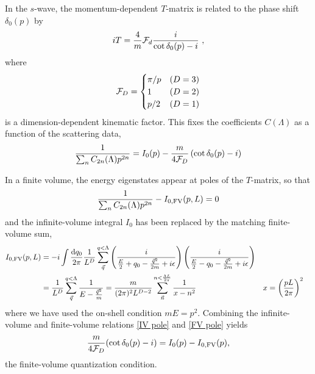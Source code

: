 In the $s$-wave, the momentum-dependent $T$-matrix is related to the phase shift $\delta_0(p)$ by
\begin{equation}\label{eq:cot delta}
    i T = \frac{4}{m}\mathcal{F}_d\frac{i}{\cot \delta_0(p)-i}\ ,
\end{equation}
where
\begin{equation}
    \mathcal{F}_D
    =
    \begin{cases}
        \pi/p   & (D=3)\\
        1       & (D=2)\\
        p/2     & (D=1)
\end{cases}
\end{equation}
is a dimension-dependent kinematic factor.
This fixes the coefficients $C(\Lambda)$ as a function of the scattering data,
\begin{equation}\label{eq:IV pole}
    \frac{1}{\sum_n C_{2n}(\Lambda) p^{2n}}
    =
    I_0(p) - \frac{m}{4 \mathcal{F}_D}\left(\cot \delta_0(p) - i\right)
\end{equation}

In a finite volume, the energy eigenstates appear at poles of the $T$-matrix, so that
\begin{equation}\label{eq:FV pole}
    \frac{1}{\sum_n C_{2n}(\Lambda) p^{2n}} - I_{0,\textrm{FV}}(p,L) = 0
\end{equation}
and the infinite-volume integral $I_0$ has been replaced by the matching finite-volume sum,
\begin{align}
I_{0,\textrm{FV}}(p,L)
    &=-i\int \frac { \mathrm {d}q_0}{2\pi} \frac{1}{L^D}\sum_{\vec{q}}^{q < \Lambda} \left( \frac { i } { \frac{E}{2} + q _ { 0 } - \frac{\vec{q}^2}{2m} + i \epsilon } \right) \left( \frac { i } { \frac{E}{2} - q _ { 0 } - \frac{\vec{q}^2}{2m} + i \epsilon } \right)
    \\
    &=\frac{1}{L^D}\sum_{\vec{q}}^{q < \Lambda} \frac { 1 } { E - \frac{\vec{q}^2}{m} }
    =\frac{m}{(2\pi)^2 L^{D-2}} \sum_{\vec{n}}^{n < \frac{\Lambda L}{2\pi}} \frac{1}{x-n^2}
    &
    x &= \left( \frac{pL}{2\pi}\right)^2
\end{align}
where we have used the on-shell condition $mE=p^2$.  Combining the infinite-volume and finite-volume relations \eqref{IV pole} and \eqref{FV pole} yields
\begin{equation}
    \frac{m}{4\mathcal{F}_D}(\cot\delta_0(p)-i) = I_0(p) - I_{0,\textrm{FV}}(p),
\end{equation}
the finite-volume quantization condition.

